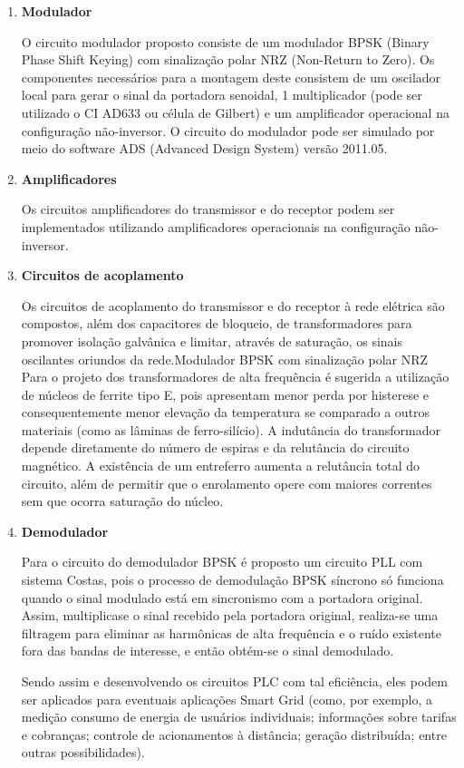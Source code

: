 	\begin{enumerate}

		\item \textbf{Modulador}
		
		 O circuito modulador proposto consiste de um modulador BPSK (Binary Phase Shift Keying) com sinalização polar NRZ (Non-Return to Zero). Os componentes necessários para a montagem deste consistem de um oscilador local para gerar o sinal da portadora senoidal, 1 multiplicador (pode ser utilizado o CI AD633 ou célula de Gilbert) e um amplificador operacional na configuração não-inversor. O circuito do modulador pode ser simulado por meio do software ADS (Advanced Design System) versão 2011.05. 
		
		\item \textbf{Amplificadores}
		
		Os circuitos amplificadores do transmissor e do receptor podem ser implementados utilizando amplificadores operacionais na configuração não-inversor.
		
		\item \textbf{Circuitos de acoplamento}

		Os circuitos de acoplamento do transmissor e do receptor à rede elétrica são compostos, além dos capacitores de bloqueio, de transformadores para promover isolação galvânica e limitar, através de saturação, os sinais oscilantes oriundos da rede.Modulador BPSK com sinalização polar NRZ Para o projeto dos transformadores de alta frequência é sugerida a utilização de núcleos de ferrite tipo E, pois apresentam menor perda por histerese e consequentemente menor elevação da temperatura se comparado a outros materiais (como as lâminas de ferro-silício). A indutância do transformador depende diretamente do número de espiras e da relutância do circuito magnético. A existência de um entreferro aumenta a relutância total do circuito, além de permitir que o enrolamento opere com maiores correntes sem que ocorra saturação do núcleo. 
		
		\item \textbf{Demodulador}

	Para o circuito do demodulador BPSK é proposto um circuito PLL com sistema Costas, pois o processo de demodulação BPSK síncrono só funciona quando o sinal modulado está em sincronismo com a portadora original. Assim, multiplicase o sinal recebido pela portadora original, realiza-se uma filtragem para eliminar as harmônicas de alta frequência e o ruído existente fora das bandas de interesse, e então obtém-se o sinal demodulado.

	Sendo assim e desenvolvendo os circuitos PLC com tal eficiência, eles podem ser aplicados para eventuais aplicações Smart Grid (como, por exemplo, a medição consumo de energia de usuários individuais; informações sobre tarifas e cobranças; controle de acionamentos à distância; geração distribuída; entre outras possibilidades).

	\end{enumerate}


